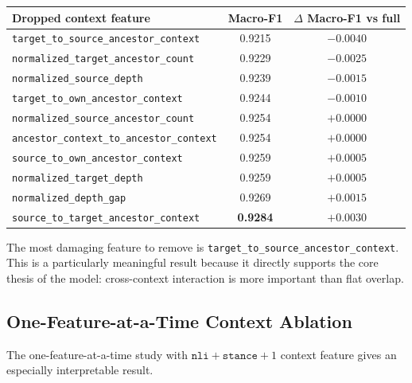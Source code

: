 \documentclass[11pt,a4paper]{article}
\begin{document}
\begin{center}
\begin{tabular}{lcc}
\toprule
Dropped context feature & Macro-F1 & \(\Delta\) Macro-F1 vs full \\
\midrule
\texttt{target\_to\_source\_ancestor\_context} & 0.9215 & \(-0.0040\) \\
\texttt{normalized\_target\_ancestor\_count} & 0.9229 & \(-0.0025\) \\
\texttt{normalized\_source\_depth} & 0.9239 & \(-0.0015\) \\
\texttt{target\_to\_own\_ancestor\_context} & 0.9244 & \(-0.0010\) \\
\texttt{normalized\_source\_ancestor\_count} & 0.9254 & \(+0.0000\) \\
\texttt{ancestor\_context\_to\_ancestor\_context} & 0.9254 & \(+0.0000\) \\
\texttt{source\_to\_own\_ancestor\_context} & 0.9259 & \(+0.0005\) \\
\texttt{normalized\_target\_depth} & 0.9259 & \(+0.0005\) \\
\texttt{normalized\_depth\_gap} & 0.9269 & \(+0.0015\) \\
\texttt{source\_to\_target\_ancestor\_context} & \textbf{0.9284} & \textbf{\(+0.0030\)} \\
\bottomrule
\end{tabular}
\end{center}

The most damaging feature to remove is \texttt{target\_to\_source\_ancestor\_context}. This is a particularly meaningful result because it directly supports the core thesis of the model: cross-context interaction is more important than flat overlap.

\subsection{One-Feature-at-a-Time Context Ablation}
The one-feature-at-a-time study with \(\texttt{nli}+\texttt{stance}+1\) context feature gives an especially interpretable result.
\end{document}
